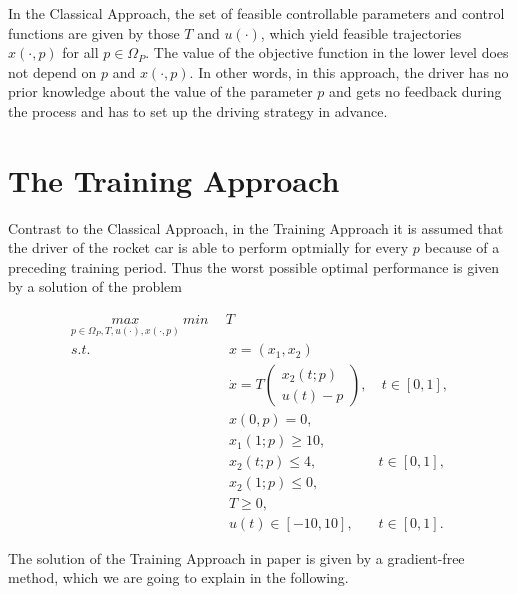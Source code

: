 In the Classical Approach, the set of feasible controllable parameters and control functions are given by those $T$ and $u(\cdot)$, which yield feasible trajectories $x(\cdot, p)$ for all $p \in \Omega_P$. The value of the objective function in the lower level does not depend on $p$ and $x(\cdot, p)$. In other words, in this approach, the driver has no prior knowledge about the value of the parameter $p$ and gets no feedback during the process and has to set up the driving strategy in advance. 



\section{The Training Approach}
Contrast to the Classical Approach, in the Training Approach it is assumed that the driver of the rocket car is able to perform optmially for every $p$ because of a preceding training period. Thus the worst possible optimal performance is given by a solution of the problem

\begin{subequations}
	\begin{align}
	   \underset{p \in \Omega_P, T, u(\cdot), x(\cdot,p)}{max}  \ 	\underset{}{min} \   & \  T \\ 
		s.t.  & \ \ x = (x_1, x_2)   \label{ta_rc_x} \\ 
             & \ \  \dot{x} = T  \begin{pmatrix}  x_2(t;p) \\ u(t)-p   \end{pmatrix}, & \ t \in [0,1],  \label{ta_rc_partial} \\
& \ \ x(0,p) = 0, \label{ta_rc_t0}\\
& \ \ x_1(1;p) \geq 10, \label{ta_rc_x1_t1} \\
& \ \ x_2(t;p) \leq 4, & t \in [0,1], \label{ta_rc_x2_tc} \\
& \ \ x_2(1;p) \leq 0, \label{ta_rc_x2_t1}  \\
& \ \ T \geq 0, \\
& \ \ u(t) \in [-10, 10], & t \in [0,1]. 
	\end{align}
	\label{ca_rc}
\end{subequations}

The solution of the Training Approach in paper \cite{MatSch22} is given by a gradient-free method, which we are going to explain in the following.














